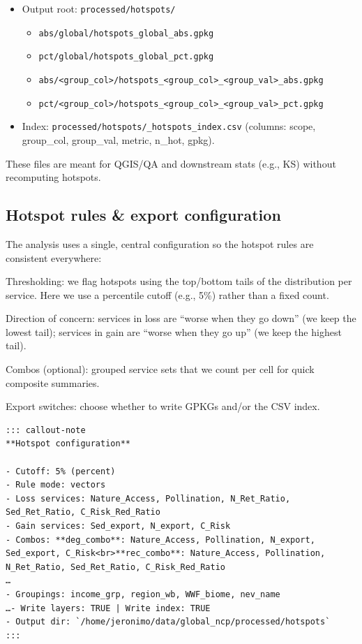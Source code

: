 \documentclass[
  letterpaper,
  DIV=11,
  numbers=noendperiod]{scrartcl}
\providecommand{\tightlist}{%
  \setlength{\itemsep}{0pt}\setlength{\parskip}{0pt}}
\begin{document}
\begin{itemize}
\tightlist
\item
  Output root: \texttt{processed/hotspots/}

  \begin{itemize}
  \tightlist
  \item
    \texttt{abs/global/hotspots\_global\_abs.gpkg}
  \item
    \texttt{pct/global/hotspots\_global\_pct.gpkg}
  \item
    \texttt{abs/\textless{}group\_col\textgreater{}/hotspots\_\textless{}group\_col\textgreater{}\_\textless{}group\_val\textgreater{}\_abs.gpkg}
  \item
    \texttt{pct/\textless{}group\_col\textgreater{}/hotspots\_\textless{}group\_col\textgreater{}\_\textless{}group\_val\textgreater{}\_pct.gpkg}
  \end{itemize}
\item
  Index: \texttt{processed/hotspots/\_hotspots\_index.csv} (columns:
  scope, group\_col, group\_val, metric, n\_hot, gpkg).
\end{itemize}

These files are meant for QGIS/QA and downstream stats (e.g., KS)
without recomputing hotspots.

\subsection{Hotspot rules \& export
configuration}\label{hotspot-rules-export-configuration}

The analysis uses a single, central configuration so the hotspot rules
are consistent everywhere:

Thresholding: we flag hotspots using the top/bottom tails of the
distribution per service. Here we use a percentile cutoff (e.g., 5\%)
rather than a fixed count.

Direction of concern: services in loss are ``worse when they go down''
(we keep the lowest tail); services in gain are ``worse when they go
up'' (we keep the highest tail).

Combos (optional): grouped service sets that we count per cell for quick
composite summaries.

Export switches: choose whether to write GPKGs and/or the CSV index.

\begin{verbatim}
::: callout-note
**Hotspot configuration**

- Cutoff: 5% (percent)
- Rule mode: vectors
- Loss services: Nature_Access, Pollination, N_Ret_Ratio, Sed_Ret_Ratio, C_Risk_Red_Ratio
- Gain services: Sed_export, N_export, C_Risk
- Combos: **deg_combo**: Nature_Access, Pollination, N_export, Sed_export, C_Risk<br>**rec_combo**: Nature_Access, Pollination, N_Ret_Ratio, Sed_Ret_Ratio, C_Risk_Red_Ratio
…
- Groupings: income_grp, region_wb, WWF_biome, nev_name
…- Write layers: TRUE | Write index: TRUE
- Output dir: `/home/jeronimo/data/global_ncp/processed/hotspots`
:::
\end{verbatim}
\end{document}
